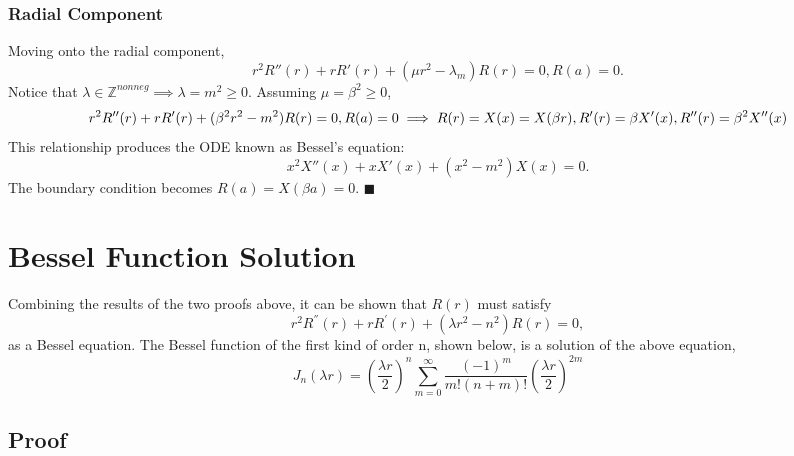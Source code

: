 \documentclass{article}
\begin{document}
\subsubsection{Radial Component}
Moving onto the radial component,
\begin{equation*}
	r^2 R''(r)+rR'(r)+(\mu r^2 -\lambda_m)R(r)=0, R(a)=0.
\end{equation*}
Notice that $\lambda \in \mathbb{Z}^{nonneg} \implies \lambda = m^2 \ge 0$. Assuming $\mu = \beta^2 \ge 0$, 
\begin{equation*}
	r^2 R''(r)+rR'(r)+(\beta^2  r^2 -m^2)R(r)=0, R(a)=0 \newline \implies R(r)=X(x)=X(\beta r), R'(r)=\beta X'(x), R''(r)=\beta^2 X''(x)
\end{equation*}This relationship produces the ODE known as Bessel's equation:
\begin{equation*}
	x^2X''(x)+xX'(x)+(x^2-m^2)X(x)=0.
\end{equation*}
The boundary condition becomes $R(a)=X(\beta a)=0$.
$\blacksquare$ 
\section{Bessel Function Solution}
Combining the results of the two proofs above, it can be shown that $R(r)$ must satisfy 
\begin{equation*}
    r^{2}R^{''}(r)+rR^{'}(r)+(\lambda r^2 -n^2)R(r)=0,
\end{equation*}as a Bessel equation. The Bessel function of the first kind of order n, shown below, is a solution of the above equation,
\begin{equation}
    J_{n}(\lambda r)=(\frac{\lambda r}{2})^{n} \sum_{m=0}^{\infty} \frac{(-1)^m}{m!(n+m)!}(\frac{\lambda r}{2})^{2m}
\end{equation}
\subsection{Proof}
\end{document}
